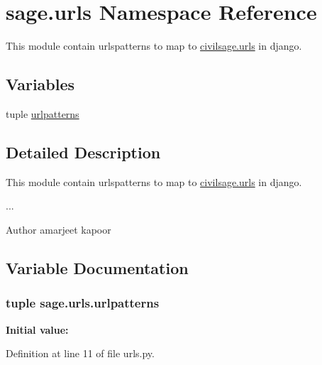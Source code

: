 \hypertarget{namespacesage_1_1urls}{}\section{sage.\+urls Namespace Reference}
\label{namespacesage_1_1urls}


This module contain urlspatterns to map to \hyperlink{namespacecivilsage_1_1urls}{civilsage.\+urls} in django.  


\subsection*{Variables}
\begin{DoxyCompactItemize}
\item 
tuple \hyperlink{namespacesage_1_1urls_a5c86cdc04e09bcea3285cc79e9c83220}{urlpatterns}
\end{DoxyCompactItemize}


\subsection{Detailed Description}
This module contain urlspatterns to map to \hyperlink{namespacecivilsage_1_1urls}{civilsage.\+urls} in django. 

... \begin{DoxyAuthor}{Author}
amarjeet kapoor 
\end{DoxyAuthor}


\subsection{Variable Documentation}
\hypertarget{namespacesage_1_1urls_a5c86cdc04e09bcea3285cc79e9c83220}{}
\subsubsection[{urlpatterns}]{\setlength{\rightskip}{0pt plus 5cm}tuple sage.\+urls.\+urlpatterns}\label{namespacesage_1_1urls_a5c86cdc04e09bcea3285cc79e9c83220}
{\bfseries Initial value\+:}


Definition at line 11 of file urls.\+py.

